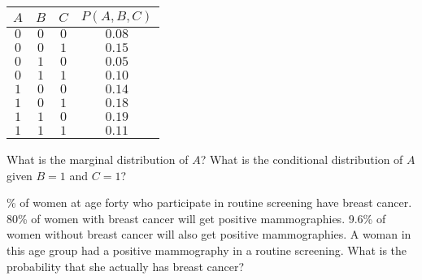 \documentclass{exam}
\newcommand{\cmark}{\ding{51}}
\newcommand{\xmark}{\ding{55}}
\newcommand{\answer}[0]{\vspace{30pt}}
\begin{document}
\begin{questions}
    \begin{minipage}{0.23\linewidth}
    {\tiny
    \begin{tabular}{cccc}
        \toprule
            $A$ & $B$ & $C$ & $P(A,B,C)$ \\
        \midrule
            $0$ & $0$ & $0$ & $0.08$ \\
            $0$ & $0$ & $1$ & $0.15$ \\
            $0$ & $1$ & $0$ & $0.05$ \\
            $0$ & $1$ & $1$ & $0.10$ \\
            $1$ & $0$ & $0$ & $0.14$ \\
            $1$ & $0$ & $1$ & $0.18$ \\
            $1$ & $1$ & $0$ & $0.19$ \\
            $1$ & $1$ & $1$ & $0.11$ \\
        \bottomrule
    \end{tabular}
    }
    \end{minipage}
    \begin{minipage}{0.75\linewidth}
        \begin{questions}
            \question What is the marginal distribution of $A$?
            \answer
            \question What is the conditional distribution of $A$ given $B=1$ and $C=1$?
            \answer
        \end{questions}
    \end{minipage}
    

    \% of women at age forty who participate in routine screening have breast cancer. 80\% of women with breast cancer will get positive mammographies. 9.6\% of women without breast cancer will also get positive mammographies. A woman in this age group had a positive mammography in a routine screening. What is the probability that she actually has breast cancer?

    \answer




\end{questions}
\end{document}
